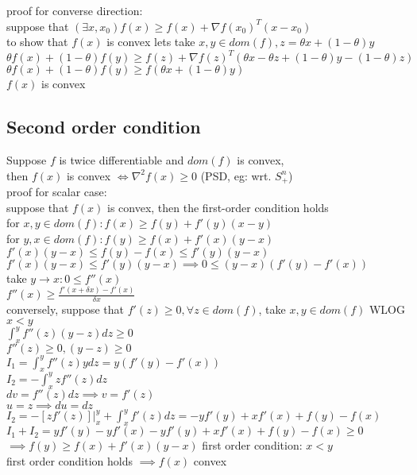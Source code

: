 \documentclass[8pt]{report}
\begin{document}
\begin{multicols*}{2}
  proof for converse direction:\\
  suppose that $(\exists x, x_0) f(x) \geq f(x) + \nabla f(x_0)^T(x-x_0)$\\
  to show that $f(x)$ is convex lets take $x,y \in dom(f), z= \theta x + (1-\theta)y$\\
  $\theta f(x) + (1-\theta) f(y) \geq f(z) + \nabla f(z)^T(\theta x - \theta z + (1-\theta)y - (1-\theta)z)$\\
  $\theta f(x) + (1-\theta) f(y) \geq f(\theta x +(1-\theta)y)$\\
  $f(x)$ is convex
  \subsection{Second order condition}
  Suppose $f$ is twice differentiable and $dom(f)$ is convex, \\
  then $f(x)$ is convex $\iff \nabla^2 f(x) \geq 0 $ (PSD, eg: wrt. $S_+^n$)\\
  
  proof for scalar case:\\
  suppose that $f(x)$ is convex, then the first-order condition holds\\
  for $x,y \in dom(f): f(x) \geq f(y) + f'(y)(x-y)$\\
  for $y,x \in dom(f): f(y) \geq f(x) + f'(x)(y-x)$\\
  $f'(x)(y-x) \leq f(y)-f(x) \leq f'(y)(y-x)$\\
  $f'(x)(y-x) \leq f'(y)(y-x) \implies 0 \leq (y-x)(f'(y)-f'(x))$\\
  take $y\to x: 0 \leq f''(x)$\\
  $f''(x) \geq \frac{f'(x+\delta x)-f'(x)}{\delta x}$\\

  conversely, suppose that $f'(z) \geq 0, \forall z \in dom(f)$, take $x,y \in dom(f)$ WLOG $x < y$\\
  $\int_x^y f''(z)(y-z) dz \geq 0$\\
  $f''(z) \geq 0, (y-z) \geq 0$\\
  $I_1 = \int_x^y f''(z)y dz =  y(f'(y)-f'(x))$\\
  $I_2 = -\int_x^y zf''(z) dz$\\
  $dv=f''(z) dz \implies v = f'(z)$\\
  $u=z\implies du = dz$\\
  $I_2 = -[z f'(z)]|_x^y + \int_x^y f'(z) dz = -y f'(y) + x f'(x)+f(y)-f(x)$\\
  $I_1+I_2=y f'(y)-y f'(x)-y f'(y) + x f'(x) + f(y)-f(x) \geq 0$\\
  $\implies f(y) \geq f(x) + f'(x)(y-x)$ first order condition: $x<y$\\
  first order condition holds $\implies f(x)$ convex\\


\end{multicols*}
\end{document}
